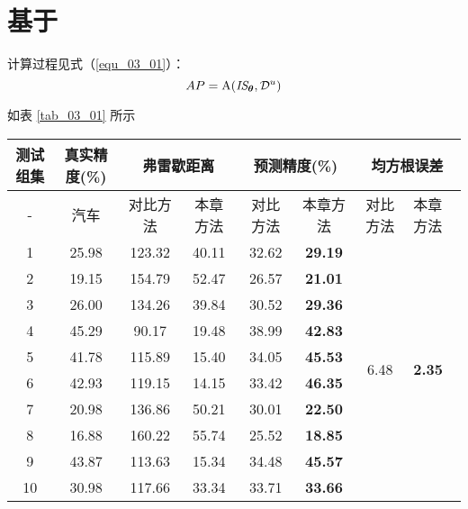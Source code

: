 \chapter{基于}
\label{cha:chap3}

计算过程见式（\ref{equ_03_01}）：
\begin{equation}
    AP=\mathrm{A}(\emph{IS}_{\bm{\bm{\theta}}}, \mathcal{D}^{u})
   \label{equ_03_01}
\end{equation}



如表 \ref{tab_03_01} 所示

\begin{table*}[!thp]
    \caption{``汽车"精度预测对比实验结果}
    \vspace{-4mm}
    \caption*{Table~\ref{tab_03_01}~Comparative experiment result of the ``car" accuracy prediction}
    \label{tab_03_01}
    \begin{tabular}{c|c|cc|cc|cl}
        \shline
        测试组集 & 真实精度(\%) &\multicolumn{2}{c|}{弗雷歇距离} &\multicolumn{2}{c|}{预测精度(\%)} &\multicolumn{2}{c}{均方根误差} \\
        \hline
        - &汽车 &对比方法 \cite{deng2021labels} &本章方法  &对比方法 \cite{deng2021labels} &本章方法   &对比方法 \cite{deng2021labels} &本章方法   \\
        \hline
        1 &25.98 &123.32 &40.11 &32.62 &\textbf{29.19} &\multirow{18}{*}{6.48} &\multirow{18}{*}{\textbf{2.35}} \\
        2 &19.15 &154.79 &52.47 &26.57 &\textbf{21.01} & & \\ 
        3 &26.00 &134.26 &39.84 &30.52 &\textbf{29.36} & & \\
        4 &45.29 &90.17 &19.48 &38.99 &\textbf{42.83} & & \\
        5 &41.78 &115.89 &15.40 &34.05 &\textbf{45.53} & & \\
        6 &42.93 &119.15 &14.15 &33.42 &\textbf{46.35} & & \\
        7 &20.98 &136.86 &50.21 &30.01 &\textbf{22.50} & & \\
        8 &16.88 &160.22 &55.74 &25.52 &\textbf{18.85} & & \\
        9 &43.87 &113.63 &15.34 &34.48 &\textbf{45.57} & & \\
        10 &30.98 &117.66 &33.34 &33.71 &\textbf{33.66} & & \\

\end{tabular}
\end{table*}
